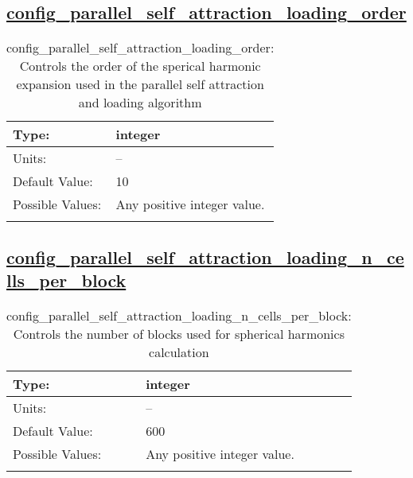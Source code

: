 \subsection[config\_parallel\_self\_attraction\_loading\_order]{\hyperref[sec:nm_tab_self_attraction_loading]{config\_parallel\_self\_attraction\_loading\_order}}
\label{subsec:nm_sec_config_parallel_self_attraction_loading_order}
\begin{center}
\begin{longtable}{| p{2.0in} || p{4.0in} |}
    \hline
    Type: & integer \\
    \hline
    Units: & -- \\
    \hline
    Default Value: & 10 \\
    \hline
    Possible Values: & Any positive integer value. \\
    \hline
    \caption{config\_parallel\_self\_attraction\_loading\_order: Controls the order of the sperical harmonic expansion used in the parallel self attraction and loading algorithm}
\end{longtable}
\end{center}
\subsection[config\_parallel\_self\_attraction\_loading\_n\_cells\_per\_block]{\hyperref[sec:nm_tab_self_attraction_loading]{config\_parallel\_self\_attraction\_loading\_n\_cells\_per\_block}}
\label{subsec:nm_sec_config_parallel_self_attraction_loading_n_cells_per_block}
\begin{center}
\begin{longtable}{| p{2.0in} || p{4.0in} |}
    \hline
    Type: & integer \\
    \hline
    Units: & -- \\
    \hline
    Default Value: & 600 \\
    \hline
    Possible Values: & Any positive integer value. \\
    \hline
    \caption{config\_parallel\_self\_attraction\_loading\_n\_cells\_per\_block: Controls the number of blocks used for spherical harmonics calculation}
\end{longtable}
\end{center}

